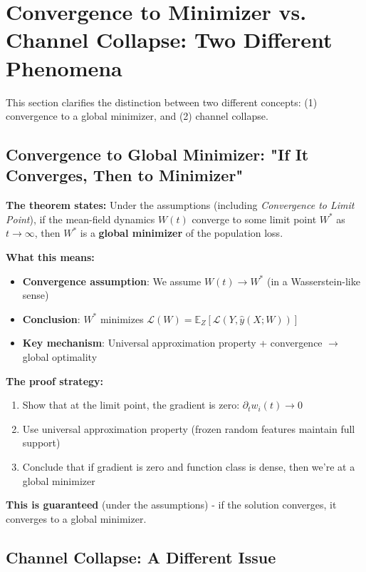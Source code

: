 \section{Convergence to Minimizer vs. Channel Collapse: Two Different Phenomena}
\label{sec:convergence-vs-collapse}

This section clarifies the distinction between two different concepts: (1) convergence to a global minimizer, and (2) channel collapse.

\subsection{Convergence to Global Minimizer: "If It Converges, Then to Minimizer"}

\textbf{The theorem states:} Under the assumptions (including \emph{Convergence to Limit Point}), if the mean-field dynamics $W(t)$ converge to some limit point $W^*$ as $t \to \infty$, then $W^*$ is a \textbf{global minimizer} of the population loss.

\textbf{What this means:}
\begin{itemize}
\item \textbf{Convergence assumption}: We assume $W(t) \to W^*$ (in a Wasserstein-like sense)
\item \textbf{Conclusion}: $W^*$ minimizes $\mathscr{L}(W) = \mathbb{E}_Z[\mathcal{L}(Y, \hat{y}(X; W))]$
\item \textbf{Key mechanism}: Universal approximation property + convergence $\to$ global optimality
\end{itemize}

\textbf{The proof strategy:}
\begin{enumerate}
\item Show that at the limit point, the gradient is zero: $\partial_t w_i(t) \to 0$
\item Use universal approximation property (frozen random features maintain full support)
\item Conclude that if gradient is zero and function class is dense, then we're at a global minimizer
\end{enumerate}

\textbf{This is guaranteed} (under the assumptions) - if the solution converges, it converges to a global minimizer.

\subsection{Channel Collapse: A Different Issue}

